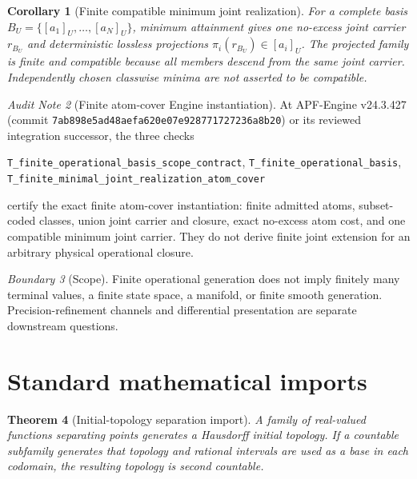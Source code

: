 \documentclass[11pt]{article}
\newtheorem{theorem}{Theorem}[section]
\newtheorem{corollary}[theorem]{Corollary}
\theoremstyle{remark}
\newtheorem{warning}[theorem]{Boundary}
\newtheorem{audit}[theorem]{Audit Note}
\begin{document}
\begin{corollary}[Finite compatible minimum joint realization]
\label{cor:ts-finite-realization}
For a complete basis $B_U=\{[a_1]_U,\ldots,[a_N]_U\}$, minimum attainment gives
one no-excess joint carrier $r_{B_U}$ and deterministic lossless projections
$\pi_i(r_{B_U})\in[a_i]_U$.  The projected family is finite and compatible
because all members descend from the same joint carrier.  Independently chosen
classwise minima are not asserted to be compatible.
\end{corollary}

\begin{audit}[Finite atom-cover Engine instantiation]
\label{audit:ts-atom-cover-engine-scope}
At APF-Engine v24.3.427 (commit \texttt{7ab898e5ad48aefa620e07e928771727236a8b20}) or its reviewed integration successor, the three checks
\begin{center}
\texttt{T\_finite\_operational\_basis\_scope\_contract},\quad
\texttt{T\_finite\_operational\_basis},\quad
\texttt{T\_finite\_minimal\_joint\_realization\_atom\_cover}
\end{center}
certify the exact finite atom-cover instantiation: finite admitted atoms,
subset-coded classes, union joint carrier and closure, exact no-excess atom
cost, and one compatible minimum joint carrier.  They do not derive finite
joint extension for an arbitrary physical operational closure.
\end{audit}

\begin{warning}[Scope]\label{warn:ts-basis-scope}
Finite operational generation does not imply finitely many terminal values, a finite state space, a manifold, or finite smooth generation.  Precision-refinement channels and differential presentation are separate downstream questions.
\end{warning}

\section{Standard mathematical imports}\label{sec:ts-standard-imports}

\begin{theorem}[Initial-topology separation import]\label{thm:ts-initial-topology}
A family of real-valued functions separating points generates a Hausdorff initial topology.  If a countable subfamily generates that topology and rational intervals are used as a base in each codomain, the resulting topology is second countable.
\end{theorem}
\end{document}
